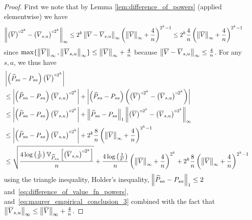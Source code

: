 \documentclass{article}
\theoremstyle{plain}
\theoremstyle{plain}
\theoremstyle{remark}
\theoremstyle{plain}
\theoremstyle{plain}
\newcommand{\Var}{\mathbb{V}}
\newcommand{\Phat}{\widehat{P}}
\newcommand{\Vc}{\overline{V}}
\begin{document}
\begin{proof}
First we note that by Lemma \ref{lem:difference_of_powers} (applied elementwise) we have
\begin{align}
     \infnorm{\left( \Vc \right)^{\circ 2^k} - \left( \Vc_{s,u} \right)^{\circ 2^k}} & 
     \leq 2^k \infnorm{\Vc - \Vc_{s,u}} \left( \infnorm{\Vc} + \frac{4}{n}\right)^{2^k - 1} \leq 2^{k} \frac{4}{n} \left( \infnorm{\Vc} + \frac{4}{n}\right)^{2^k - 1}\label{eq:difference_of_value_fn_powers}
\end{align}
since $\max \{\infnorm{\Vc}, \infnorm{\Vc_{s,u}}\} \leq \infnorm{\Vc} + \frac{4}{n}$ because $ \infnorm{\Vc - \Vc_{s,u}} \leq \frac{4}{n}$.
For any $s, a$, we thus have
\begin{align}
    &\left| \left(\Phat_{sa} - P_{sa}\right) \left( \Vc \right)^{\circ 2^k} \right| \nonumber \\
    & \leq \left| \left(\Phat_{sa} - P_{sa}\right) \left( \Vc_{s,u} \right)^{\circ 2^k} \right| + \left| \left(\Phat_{sa} - P_{sa}\right) \left(\left( \Vc \right)^{\circ 2^k} - \left( \Vc_{s,u} \right)^{\circ 2^k} \right) \right| \nonumber \\
    & \leq \left| \left(\Phat_{sa} - P_{sa}\right) \left( \Vc_{s,u} \right)^{\circ 2^k} \right| +  \onenorm{\Phat_{sa} - P_{sa}}\infnorm{\left( \Vc \right)^{\circ 2^k} - \left( \Vc_{s,u} \right)^{\circ 2^k}} \nonumber \\
    & \leq \left| \left(\Phat_{sa} - P_{sa}\right) \left( \Vc_{s,u} \right)^{\circ 2^k} \right| +  2^k\frac{8}{n} \left( \infnorm{\Vc} + \frac{4}{n}\right)^{2^k - 1} \nonumber \\
    & \leq \sqrt{\frac{4\log\left( \frac{1}{\delta'}\right) \Var_{\Phat_{sa}} \left[ \left(\Vc_{s,u} \right)^{\circ 2^k} \right]    }{n }} + \frac{4 \log \left( \frac{1}{\delta'} \right)}{n} \left( \infnorm{\Vc} + \frac{4}{n}\right)^{2^k } + 2^{k}\frac{8}{n} \left( \infnorm{\Vc} + \frac{4}{n}\right)^{2^k - 1} \label{eq:vihat_pihat_ineq_1}
\end{align}
using the triangle inequality, Holder's inequality, $ \onenorm{\Phat_{sa} - P_{sa}} \leq 2$ and~\eqref{eq:difference_of_value_fn_powers}, and~\eqref{eq:maurer_empirical_conclusion_3} combined with the fact that $\infnorm{\Vc_{s,u}} \leq \infnorm{\Vc} + \frac{4}{n}$.


\end{proof}
\end{document}
